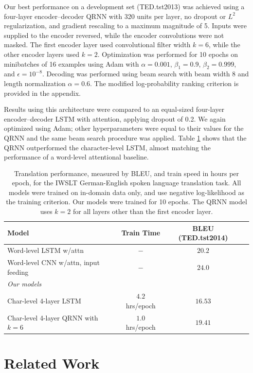 \documentclass{article} %
\begin{document}
Our best performance on a development set (TED.tst2013) was achieved using a four-layer encoder--decoder QRNN with 320 units per layer, no dropout or $L^2$ regularization, and gradient rescaling to a maximum magnitude of 5. Inputs were supplied to the encoder reversed, while the encoder convolutions were not masked. The first encoder layer used convolutional filter width $k=6$, while the other encoder layers used $k=2$.
Optimization was performed for 10 epochs on minibatches of 16 examples using Adam \citep{kingma2014adam} with $\alpha=0.001$, $\beta_1=0.9$, $\beta_2=0.999$, and $\epsilon=10^{-8}$. Decoding was performed using beam search with beam width 8 and length normalization $\alpha=0.6$. The modified log-probability ranking criterion is provided in the appendix.

Results using this architecture were compared to an equal-sized four-layer encoder--decoder LSTM with attention, applying dropout of 0.2. We again optimized using Adam; other hyperparameters were equal to their values for the QRNN and the same beam search procedure was applied. Table \ref{table:MTresults} shows that the QRNN outperformed the character-level LSTM, almost matching the performance of a word-level attentional baseline.
\begin{table}
\centering
\small
\begin{tabular}{l|ccc}
\toprule
\bf Model & \bf Train Time & \bf BLEU (TED.tst2014) \\
\midrule
Word-level LSTM w/attn \citep{Ranzato2016} & $-$ & $20.2$ \\
Word-level CNN w/attn, input feeding \citep{Wiseman2016} & $-$ & $24.0$ \\
\midrule
{\it Our models}\\
Char-level 4-layer LSTM & $4.2$ hrs/epoch & $16.53$ \\
Char-level 4-layer QRNN with $k=6$ & $1.0$ hrs/epoch & $19.41$ \\
\bottomrule
\end{tabular}
\caption{
Translation performance, measured by BLEU, and train speed in hours per epoch, for the IWSLT German-English spoken language translation task. All models were trained on in-domain data only, and use negative log-likelihood as the training criterion.
Our models were trained for 10 epochs. The QRNN model uses $k=2$ for all layers other than the first encoder layer.
}
\label{table:MTresults}
\end{table}

\section{Related Work}
\end{document}
